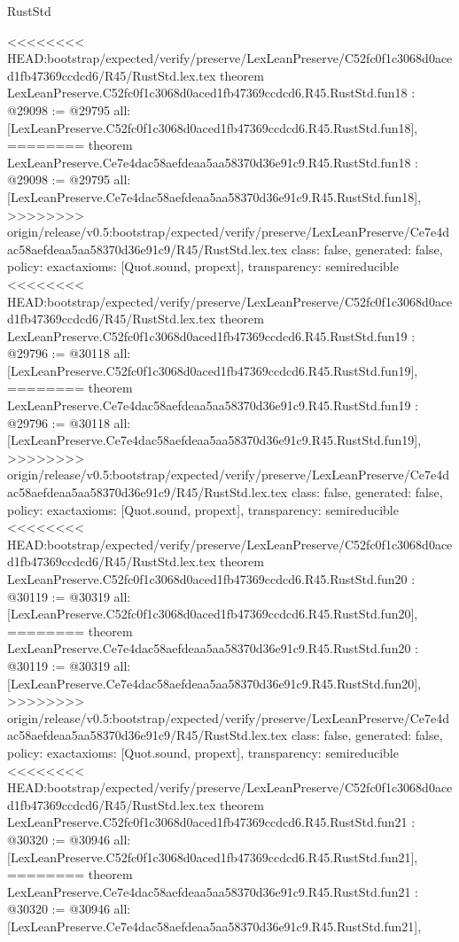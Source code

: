 \begin{lexlean}{RustStd}
\begin{coremodule}
{\begin{coremodule}
{{{{{{{{{{{{{{{{{{{{{}
<<<<<<<< HEAD:bootstrap/expected/verify/preserve/LexLeanPreserve/C52fc0f1c3068d0aced1fb47369ccdcd6/R45/RustStd.lex.tex
theorem LexLeanPreserve.C52fc0f1c3068d0aced1fb47369ccdcd6.R45.RustStd.fun18 : @29098 := @29795 {
  all: [LexLeanPreserve.C52fc0f1c3068d0aced1fb47369ccdcd6.R45.RustStd.fun18],
========
theorem LexLeanPreserve.Ce7e4dac58aefdeaa5aa58370d36e91c9.R45.RustStd.fun18 : @29098 := @29795 {
  all: [LexLeanPreserve.Ce7e4dac58aefdeaa5aa58370d36e91c9.R45.RustStd.fun18],
>>>>>>>> origin/release/v0.5:bootstrap/expected/verify/preserve/LexLeanPreserve/Ce7e4dac58aefdeaa5aa58370d36e91c9/R45/RustStd.lex.tex
  class: false,
  generated: false,
  policy: exact{axioms: [Quot.sound, propext]},
  transparency: semireducible
}
<<<<<<<< HEAD:bootstrap/expected/verify/preserve/LexLeanPreserve/C52fc0f1c3068d0aced1fb47369ccdcd6/R45/RustStd.lex.tex
theorem LexLeanPreserve.C52fc0f1c3068d0aced1fb47369ccdcd6.R45.RustStd.fun19 : @29796 := @30118 {
  all: [LexLeanPreserve.C52fc0f1c3068d0aced1fb47369ccdcd6.R45.RustStd.fun19],
========
theorem LexLeanPreserve.Ce7e4dac58aefdeaa5aa58370d36e91c9.R45.RustStd.fun19 : @29796 := @30118 {
  all: [LexLeanPreserve.Ce7e4dac58aefdeaa5aa58370d36e91c9.R45.RustStd.fun19],
>>>>>>>> origin/release/v0.5:bootstrap/expected/verify/preserve/LexLeanPreserve/Ce7e4dac58aefdeaa5aa58370d36e91c9/R45/RustStd.lex.tex
  class: false,
  generated: false,
  policy: exact{axioms: [Quot.sound, propext]},
  transparency: semireducible
}
<<<<<<<< HEAD:bootstrap/expected/verify/preserve/LexLeanPreserve/C52fc0f1c3068d0aced1fb47369ccdcd6/R45/RustStd.lex.tex
theorem LexLeanPreserve.C52fc0f1c3068d0aced1fb47369ccdcd6.R45.RustStd.fun20 : @30119 := @30319 {
  all: [LexLeanPreserve.C52fc0f1c3068d0aced1fb47369ccdcd6.R45.RustStd.fun20],
========
theorem LexLeanPreserve.Ce7e4dac58aefdeaa5aa58370d36e91c9.R45.RustStd.fun20 : @30119 := @30319 {
  all: [LexLeanPreserve.Ce7e4dac58aefdeaa5aa58370d36e91c9.R45.RustStd.fun20],
>>>>>>>> origin/release/v0.5:bootstrap/expected/verify/preserve/LexLeanPreserve/Ce7e4dac58aefdeaa5aa58370d36e91c9/R45/RustStd.lex.tex
  class: false,
  generated: false,
  policy: exact{axioms: [Quot.sound, propext]},
  transparency: semireducible
}
<<<<<<<< HEAD:bootstrap/expected/verify/preserve/LexLeanPreserve/C52fc0f1c3068d0aced1fb47369ccdcd6/R45/RustStd.lex.tex
theorem LexLeanPreserve.C52fc0f1c3068d0aced1fb47369ccdcd6.R45.RustStd.fun21 : @30320 := @30946 {
  all: [LexLeanPreserve.C52fc0f1c3068d0aced1fb47369ccdcd6.R45.RustStd.fun21],
========
theorem LexLeanPreserve.Ce7e4dac58aefdeaa5aa58370d36e91c9.R45.RustStd.fun21 : @30320 := @30946 {
  all: [LexLeanPreserve.Ce7e4dac58aefdeaa5aa58370d36e91c9.R45.RustStd.fun21],
}}}}}}}}}}}}}}}}}}}}}}}}}
\end{coremodule}}
\end{coremodule}
\end{lexlean}

